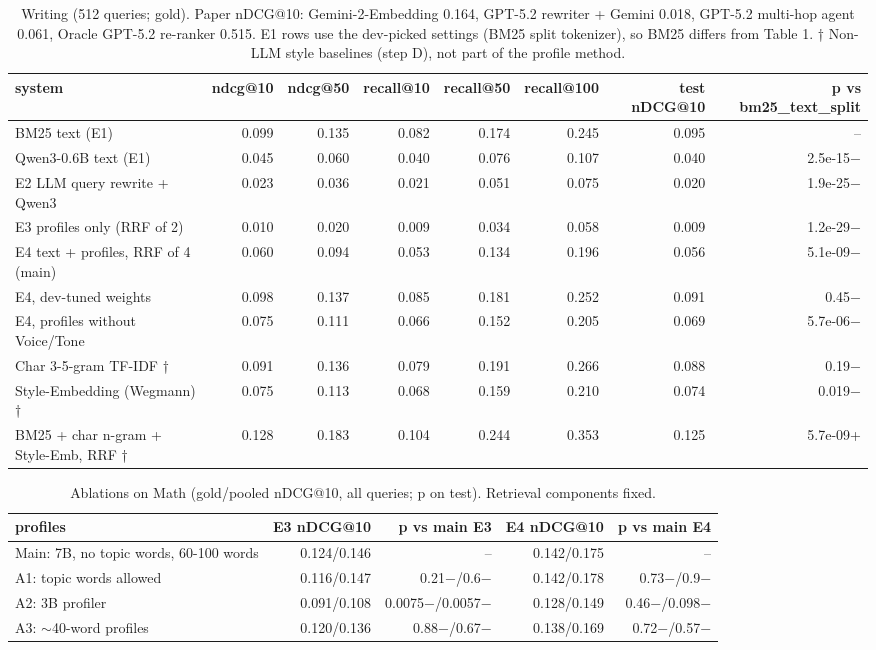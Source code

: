 \begin{table}[t]
\centering\small
\caption{Writing (512 queries; gold). Paper nDCG@10: Gemini-2-Embedding 0.164, GPT-5.2 rewriter + Gemini 0.018, GPT-5.2 multi-hop agent 0.061, Oracle GPT-5.2 re-ranker 0.515. E1 rows use the dev-picked settings (BM25 split tokenizer), so BM25 differs from Table 1. † Non-LLM style baselines (step D), not part of the profile method.}
\label{tab:writing}
\begin{tabular}{lrrrrrrr}
\toprule
system & ndcg@10 & ndcg@50 & recall@10 & recall@50 & recall@100 & test nDCG@10 & p vs bm25\_text\_split \\
\midrule
BM25 text (E1) & 0.099 & 0.135 & 0.082 & 0.174 & 0.245 & 0.095 & – \\
Qwen3-0.6B text (E1) & 0.045 & 0.060 & 0.040 & 0.076 & 0.107 & 0.040 & 2.5e-15$-$ \\
E2 LLM query rewrite + Qwen3 & 0.023 & 0.036 & 0.021 & 0.051 & 0.075 & 0.020 & 1.9e-25$-$ \\
E3 profiles only (RRF of 2) & 0.010 & 0.020 & 0.009 & 0.034 & 0.058 & 0.009 & 1.2e-29$-$ \\
E4 text + profiles, RRF of 4 (main) & 0.060 & 0.094 & 0.053 & 0.134 & 0.196 & 0.056 & 5.1e-09$-$ \\
E4, dev-tuned weights & 0.098 & 0.137 & 0.085 & 0.181 & 0.252 & 0.091 & 0.45$-$ \\
E4, profiles without Voice/Tone & 0.075 & 0.111 & 0.066 & 0.152 & 0.205 & 0.069 & 5.7e-06$-$ \\
Char 3-5-gram TF-IDF † & 0.091 & 0.136 & 0.079 & 0.191 & 0.266 & 0.088 & 0.19$-$ \\
Style-Embedding (Wegmann) † & 0.075 & 0.113 & 0.068 & 0.159 & 0.210 & 0.074 & 0.019$-$ \\
BM25 + char n-gram + Style-Emb, RRF † & 0.128 & 0.183 & 0.104 & 0.244 & 0.353 & 0.125 & 5.7e-09+ \\
\bottomrule
\end{tabular}
\end{table}

\begin{table}[t]
\centering\small
\caption{Ablations on Math (gold/pooled nDCG@10, all queries; p on test). Retrieval components fixed.}
\label{tab:ablations}
\begin{tabular}{lrrrr}
\toprule
profiles & E3 nDCG@10 & p vs main E3 & E4 nDCG@10 & p vs main E4 \\
\midrule
Main: 7B, no topic words, 60-100 words & 0.124/0.146 & – & 0.142/0.175 & – \\
A1: topic words allowed & 0.116/0.147 & 0.21$-$/0.6$-$ & 0.142/0.178 & 0.73$-$/0.9$-$ \\
A2: 3B profiler & 0.091/0.108 & 0.0075$-$/0.0057$-$ & 0.128/0.149 & 0.46$-$/0.098$-$ \\
A3: $\sim$40-word profiles & 0.120/0.136 & 0.88$-$/0.67$-$ & 0.138/0.169 & 0.72$-$/0.57$-$ \\
\bottomrule
\end{tabular}
\end{table}

